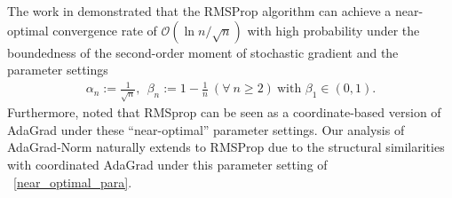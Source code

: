 \documentclass[standalone]{article}
\def\red#1{\textcolor{red}{#1}}
\begin{document}
The work in \cite{zou2019sufficient} demonstrated that the RMSProp algorithm can achieve a near-optimal convergence rate of $\mathcal{O}(\ln n/\sqrt{n})$ with high probability under the boundedness of the second-order moment of stochastic gradient and the parameter settings 
\begin{align}\label{near_optimal_para}
\alpha_{n}:=\frac{1}{\sqrt{n}}, \ \  \beta_{n}:=1-\frac{1}{n}\ (\forall\ n\ge 2)\ \text{with}\,\, \beta_{1} \in (0,1).
\end{align}
Furthermore, \cite{zou2019sufficient,chen2022towards} noted that RMSprop can be seen as a coordinate-based version of AdaGrad under these ``near-optimal'' parameter settings. Our analysis of AdaGrad-Norm naturally extends to RMSProp due to the structural similarities with coordinated AdaGrad under this parameter setting of ~\cref{near_optimal_para}.%
\end{document}
